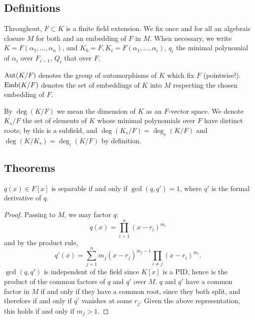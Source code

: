 \subsection{Definitions}

Throughout, $F \subset K$ is a finite field extension.  We fix once and for
all an algebraic closure $M$ for both and an embedding of $F$ in $M$.  When
necessary, we write $K = F(\alpha_1, \dots, \alpha_n)$, and $K_0 = F, K_i =
F(\alpha_1, \dots, \alpha_i)$, $q_i$ the minimal polynomial of $\alpha_i$ over
$F_{i - 1}$, $Q_i$ that over $F$.

\begin{definition} $\operatorname{\text{Aut}}(K/F)$ denotes the group of automorphisms of $K$ which fix
$F$ (pointwise!).  $\operatorname{\text{Emb}}(K/F)$ denotes the set of embeddings of $K$ into $M$
respecting the chosen embedding of $F$.
\label{def:gal}
\end{definition}

\begin{definition} By $\deg(K/F)$ we mean the dimension of $K$ as an $F$-vector
space.  We denote $K_s/F$ the set of elements of $K$ whose minimal polynomials
over $F$ have distinct roots; by  this is a subfield, and
$\deg(K_s/F) = \deg_s(K/F)$ and $\deg(K/K_s) = \deg_i(K/F)$ by definition.
\label{def:sep}
\end{definition}
\subsection{Theorems}

\begin{lemma} $q(x) \in F[x]$ is separable if and only if $\gcd(q, q') = 1$,
where $q'$ is the formal derivative of $q$. 
\label{der_poly}
\end{lemma}

\begin{proof} Passing to $M$, we may factor $q$:
\begin{equation*}
q(x) = \prod_{i = 1}^n (x - r_i)^{m_i}
\end{equation*}
and by the product rule,
\begin{equation*}
q'(x) = \sum_{j = 1}^n m_j (x - r_j)^{m_j - 1} \prod_{i \neq j} (x -
	r_i)^{m_i}.
\end{equation*}
$\gcd(q, q')$ is independent of the field since $K[x]$ is a PID, hence is the
product of the common factors of $q$ and $q'$ over $M$.  $q$ and $q'$ have a
common factor in $M$ if and only if they have a common root, since they both
split, and therefore if and only if $q'$ vanishes at some $r_j$.  Given the
above representation, this holds if and only if $m_j > 1$. \end{proof}

